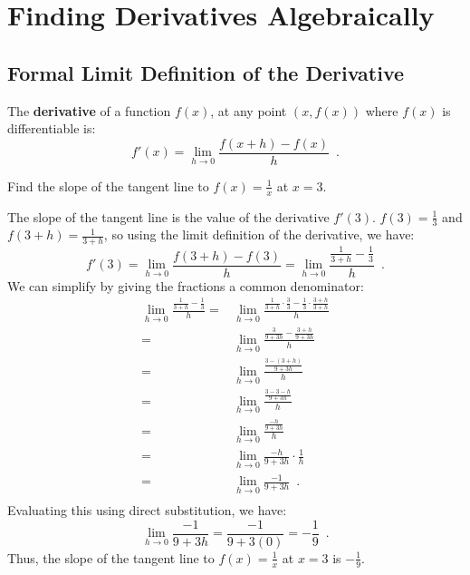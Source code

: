 \section{Finding Derivatives Algebraically}
\label{sec:algderiv}

\subsection{Formal Limit Definition of the Derivative}

\begin{definition}
The {\bf derivative} of a function $f(x)$, at any point $(x, f(x))$ where $f(x)$ is differentiable is:
$$f'(x)=\lim_{h\to 0}\frac{f(x+h)-f(x)}{h} \enspace .$$
\end{definition}

\begin{example}
Find the slope of the tangent line to $f(x)=\frac{1}{x}$ at $x=3$.

\begin{solution} The slope of the tangent line is the value of the derivative $f'(3)$. $f(3)=\frac{1}{3}$ and $f(3+h)=\frac{1}{3+h}$, so using the limit definition of the derivative, we have:
$$f'(3)=\lim_{h\to 0}\frac{f(3+h)-f(3)}{h}=\lim_{h\to 0}\frac{\frac{1}{3+h}-\frac{1}{3}}{h} \enspace .$$
We can simplify by giving the fractions a common denominator:
\begin{align*}
		\lim_{h\to 0}\frac{\frac{1}{3+h}-\frac{1}{3}}{h}=& \lim_{h\to 0}\frac{\frac{1}{3+h}\cdot\frac{3}{3}-\frac{1}{3}\cdot\frac{3+h}{3+h}}{h} \\
		=& \lim_{h\to 0}\frac{\frac{3}{9+3h}-\frac{3+h}{9+3h}}{h} \\
		=& \lim_{h\to 0}\frac{\frac{3-(3+h)}{9+3h}}{h} \\
		=& \lim_{h\to 0}\frac{\frac{3-3-h}{9+3h}}{h} \\
		=& \lim_{h\to 0}\frac{\frac{-h}{9+3h}}{h} \\
		=& \lim_{h\to 0}\frac{-h}{9+3h}\cdot\frac{1}{h} \\
		=& \lim_{h\to 0}\frac{-1}{9+3h} \enspace .\\
	\end{align*}
Evaluating this using direct substitution, we have:
$$\lim_{h\to 0}\frac{-1}{9+3h}=\frac{-1}{9+3(0)}=-\frac{1}{9} \enspace.$$
Thus, the slope of the tangent line to $f(x)=\frac{1}{x}$ at $x=3$ is $-\frac{1}{9}$.
\end{solution}\end{example}

